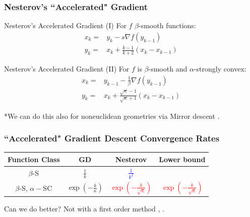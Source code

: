 \documentclass{beamer}
\newcommand\Fontvi{\fontsize{8}{7.2}\selectfont}
\newcommand\fontbig{\fontsize{15}{7.2}\selectfont}
\begin{document}
\begin{frame}

\frametitle{Nesterov's ``Accelerated" Gradient}


\begin{block}{Nesterov's Accelerated Gradient (I)}
For $f$ $\beta$-smooth functions:
\begin{align*}
    x_k =& y_k - s \nabla f(y_{k-1}) \\
    y_k =& x_k + \frac{k-1}{k+2}(x_k - x_{k-1})
\end{align*}
\end{block}

\begin{block}{Nesterov's Accelerated Gradient (II)}
For $f$ is $\beta$-smooth and $\alpha$-strongly convex:
\begin{align*}
x_k =& y_{k-1} - \frac{1}{\beta} \nabla f(y_{k-1})\\
y_k =& x_k + \frac{\sqrt{\kappa} - 1}{\sqrt{\kappa}+1} (x_k - x_{k-1})
\end{align*}

\end{block}

\Fontvi
*We can do this also for noneuclidean geometries via Mirror descent \cite{DBLP:journals/ftml/Bubeck15}.  

\end{frame}



\begin{frame}
\frametitle{``Accelerated" Gradient Descent Convergence Rates}
\fontbig
\begin{center}


 \begin{tabular}{||c c c c ||} 
 \hline
 Function Class   & GD  &  Nesterov   {& Lower bound }\\ [0.5ex] 
 \hline\hline
 $\beta$-S & $\frac{1}{k}$ & \textcolor{blue}{$\frac{1}{k^2}$} & \onslide<2->{ \textcolor{blue}{$\frac{1}{k^2}$} } \\ [1ex]
 \hline
 $\beta$-S, $\alpha-$SC  &  $\exp\left(-\frac{k}{\kappa}\right)$ & \textcolor{red}{$\exp\left(-\frac{k}{\sqrt{\kappa}}  \right)$} &  {\textcolor{red}{ $\exp\left(-\frac{k}{\sqrt{\kappa}}  \right)$} }\\ [1ex]
 \hline
\end{tabular}



\end{center}



\begin{block}{Can we do better?}
 {Not with a first order method \cite{DBLP:journals/ftml/Bubeck15}, \cite{nesterov2004introductory}.}
\end{block}



\end{frame}
\end{document}
